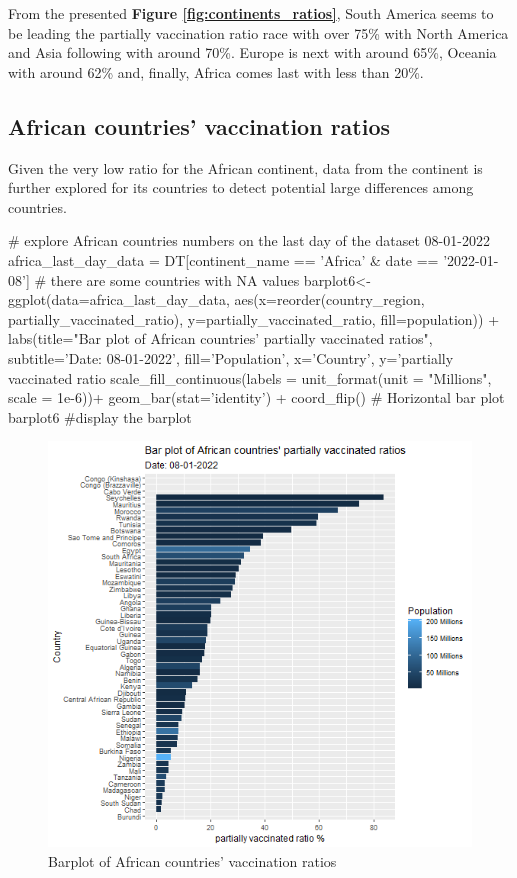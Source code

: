 From the presented  \textbf{Figure \ref{fig:continents_ratios}}, South America seems to be leading the partially vaccination ratio race with over 75\% with North America and Asia following with around 70\%. Europe is next with around 65\%, Oceania with around 62\% and, finally, Africa comes last with less than 20\%.

\subsection{African countries' vaccination ratios}
Given the very low ratio for the African continent, data from the continent is further explored for its countries to detect potential large differences among countries.

\begin{Rcode}{\scriptsize}
# explore African countries numbers on the last day of the dataset 08-01-2022
africa_last_day_data = DT[continent_name == 'Africa' & date == '2022-01-08']
# there are some countries with NA values
barplot6<-ggplot(data=africa_last_day_data, 
                   aes(x=reorder(country_region, partially_vaccinated_ratio), 
                       y=partially_vaccinated_ratio, 
                       fill=population)) +
  labs(title="Bar plot of African countries' partially vaccinated ratios",
       subtitle='Date: 08-01-2022', fill='Population',
       x='Country', y='partially vaccinated ratio %
  scale_fill_continuous(labels = unit_format(unit = "Millions", scale = 1e-6))+
  geom_bar(stat='identity') +
  coord_flip() # Horizontal bar plot
barplot6 #display the barplot
\end{Rcode}

\begin{figure}[h]
    \centering
    \includegraphics[width=12cm]{figures/Africa_ratios.png}
    \caption{Barplot of African countries' vaccination ratios}
    \label{fig:africa_ratios}
\end{figure}
\FloatBarrier %

